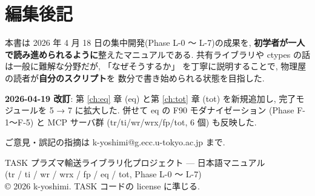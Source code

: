 \documentclass[11pt,a4paper]{report}
\begin{document}
\chapter*{編集後記}

本書は 2026 年 4 月 18 日の集中開発(Phase L-0 〜 L-7)の成果を,
\textbf{初学者が一人で読み進められるように}整えたマニュアルである.
共有ライブラリや ctypes の話は一般に難解な分野だが, 「なぜそうするか」
を丁寧に説明することで, 物理屋の読者が\textbf{自分のスクリプト}を
数分で書き始められる状態を目指した.

\textbf{2026-04-19 改訂}: 第 \ref{ch:eq} 章 (eq) と第 \ref{ch:tot} 章
(tot) を新規追加し, 完了モジュールを 5 → 7 に拡大した. 併せて
eq の F90 モダナイゼーション (Phase F-1〜F-5) と MCP サーバ群
(tr/ti/wr/wrx/fp/tot, 6 個) も反映した.

ご意見・誤記の指摘は k-yoshimi@g.ecc.u-tokyo.ac.jp まで.

\vfill
\begin{center}\small
TASK プラズマ輸送ライブラリ化プロジェクト --- 日本語マニュアル\\
(tr / ti / wr / wrx / fp / eq / tot, Phase L-0 〜 L-7)\\
© 2026 k-yoshimi. TASK コードの license に準じる.
\end{center}
\end{document}
